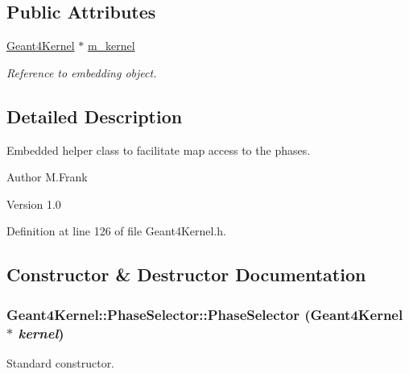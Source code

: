 \subsection*{Public Attributes}
\begin{DoxyCompactItemize}
\item 
\hyperlink{class_d_d4hep_1_1_simulation_1_1_geant4_kernel}{Geant4Kernel} $\ast$ \hyperlink{class_d_d4hep_1_1_simulation_1_1_geant4_kernel_1_1_phase_selector_a8f91fcbd0cf2877738f2e227a697d88c}{m\_\-kernel}
\begin{DoxyCompactList}\small\item\em Reference to embedding object. \item\end{DoxyCompactList}\end{DoxyCompactItemize}


\subsection{Detailed Description}
Embedded helper class to facilitate map access to the phases. \begin{DoxyAuthor}{Author}
M.Frank 
\end{DoxyAuthor}
\begin{DoxyVersion}{Version}
1.0 
\end{DoxyVersion}


Definition at line 126 of file Geant4Kernel.h.

\subsection{Constructor \& Destructor Documentation}
\hypertarget{class_d_d4hep_1_1_simulation_1_1_geant4_kernel_1_1_phase_selector_a3a641f53e3730efcff6eba4a42d509d1}{
\subsubsection[{PhaseSelector}]{\setlength{\rightskip}{0pt plus 5cm}Geant4Kernel::PhaseSelector::PhaseSelector ({\bf Geant4Kernel} $\ast$ {\em kernel})}}
\label{class_d_d4hep_1_1_simulation_1_1_geant4_kernel_1_1_phase_selector_a3a641f53e3730efcff6eba4a42d509d1}


Standard constructor. 

